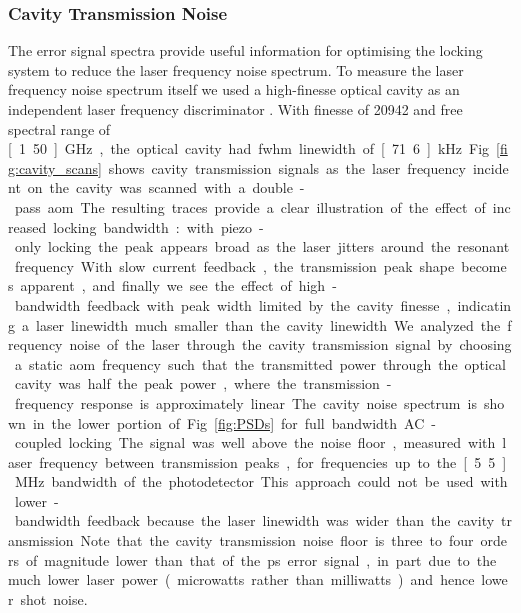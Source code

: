 

\subsubsection{Cavity Transmission Noise}
The error signal spectra provide useful information for optimising the locking system to reduce the laser frequency noise spectrum.
To measure the laser frequency noise spectrum itself we used a high-finesse optical cavity as an independent laser frequency discriminator \cite{equipment}.
With finesse of 20942 and free spectral range of \unit[1.50]{GHz}, the optical cavity had \gls*{fwhm} linewidth of \unit[71.6]{kHz}.
Fig.~\ref{fig:cavity_scans} shows cavity transmission signals as the laser frequency incident on the cavity was scanned with a double-pass \gls*{aom}.
The resulting traces provide a clear illustration of the effect of increased locking bandwidth: with piezo-only locking the peak appears broad as the laser jitters around the resonant frequency.
With slow current feedback, the transmission peak shape becomes apparent, and finally we see the effect of high-bandwidth feedback with peak width limited by the cavity finesse, indicating a laser linewidth much smaller than the cavity linewidth.

We analyzed the frequency noise of the laser through the cavity transmission signal by choosing a static \gls*{aom} frequency such that the transmitted power through the optical cavity was half the peak power, where the transmission-frequency response is approximately linear. 

The cavity noise spectrum is shown in the lower portion of Fig.~\ref{fig:PSDs} for full bandwidth AC-coupled locking.
The signal was well above the noise floor, measured with laser frequency between transmission peaks, for frequencies up to the \unit[5.5]{MHz} bandwidth of the photodetector.
 This approach could not be used with lower-bandwidth feedback because the laser linewidth was wider than the cavity transmission.
 Note that the cavity transmission noise floor is three to four orders of magnitude lower than that of the \gls*{ps} error signal, in part due to the much lower laser power (microwatts rather than milliwatts) and hence lower shot noise.


